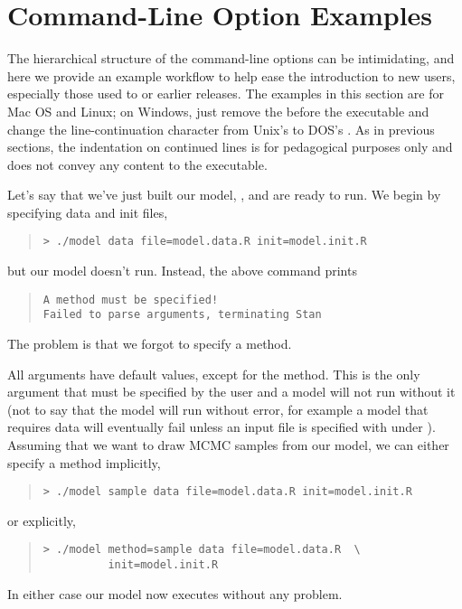 \section{Command-Line Option Examples}

The hierarchical structure of the command-line options can be
intimidating, and here we provide an example workflow to help ease the
introduction to new users, especially those used to  or
earlier releases.  The examples in this section are for Mac OS and
Linux; on Windows, just remove the  before the executable and
change the line-continuation character from Unix's
\code{\textbackslash} to DOS's \code{\textasciicircum}.  As in
previous sections, the indentation on continued lines is for
pedagogical purposes only and does not convey any content to the
executable.

Let's say that we've just built our model, , and are ready to run.
We begin by specifying data and init files,
%
\begin{quote}
\begin{Verbatim}[fontshape=sl]
> ./model data file=model.data.R init=model.init.R
\end{Verbatim}
\end{quote}
%
but our model doesn't run.  Instead, the above command prints
%
\begin{quote}
\begin{Verbatim}
A method must be specified!
Failed to parse arguments, terminating Stan
\end{Verbatim}
\end{quote}
%
The problem is that we forgot to specify a method.

All \Stan arguments have default values, except for the method.  This
is the only argument that must be specified by the user and a model
will not run without it (not to say that the model will run without error,
for example a model that requires data will eventually fail unless an input file
is specified with  under ).  Assuming that we want to draw
MCMC samples from our model, we can either specify a method
implicitly,
%
\begin{quote}
\begin{Verbatim}[fontshape=sl]
> ./model sample data file=model.data.R init=model.init.R
\end{Verbatim}
\end{quote}
%
or explicitly,
%
\begin{quote}
\begin{Verbatim}[fontshape=sl]
> ./model method=sample data file=model.data.R  \
          init=model.init.R
\end{Verbatim}
\end{quote}
%
In either case our model now executes without any problem.

